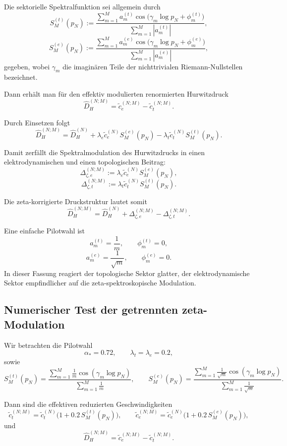 \documentclass[12pt,a4paper]{article}
\theoremstyle{definition}
\begin{document}
	Die sektorielle Spektralfunktion sei allgemein durch
	\[
	S_M^{(t)}(p_N)
	:=
	\frac{\displaystyle\sum_{m=1}^{M} a_m^{(t)}
		\cos\!\bigl(\gamma_m\log p_N+\phi_m^{(t)}\bigr)}
	{\displaystyle\sum_{m=1}^{M}|a_m^{(t)}|},
	\]
	\[
	S_M^{(e)}(p_N)
	:=
	\frac{\displaystyle\sum_{m=1}^{M} a_m^{(e)}
		\cos\!\bigl(\gamma_m\log p_N+\phi_m^{(e)}\bigr)}
	{\displaystyle\sum_{m=1}^{M}|a_m^{(e)}|},
	\]
	gegeben, wobei \(\gamma_m\) die imaginären Teile der nichttrivialen Riemann-Nullstellen bezeichnet.
	
	Dann erhält man für den effektiv modulierten renormierten Hurwitzdruck
	\[
	\widehat D_H^{(N;M)}
	=
	\tilde c_e^{(N;M)}-\tilde c_t^{(N;M)}.
	\]
	
	Durch Einsetzen folgt
	\[
	\widehat D_H^{(N;M)}
	=
	\widehat D_H^{(N)}
	+
	\lambda_e \tilde c_e^{(N)} S_M^{(e)}(p_N)
	-
	\lambda_t \tilde c_t^{(N)} S_M^{(t)}(p_N).
	\]
	
	Damit zerfällt die Spektralmodulation des Hurwitzdrucks in einen elektrodynamischen und einen topologischen Beitrag:
	\[
	\Delta_{\zeta,e}^{(N;M)}
	:=
	\lambda_e \tilde c_e^{(N)} S_M^{(e)}(p_N),
	\]
	\[
	\Delta_{\zeta,t}^{(N;M)}
	:=
	\lambda_t \tilde c_t^{(N)} S_M^{(t)}(p_N).
	\]
	
	Die zeta-korrigierte Druckstruktur lautet somit
	\[
	\widehat D_H^{(N;M)}
	=
	\widehat D_H^{(N)}+\Delta_{\zeta,e}^{(N;M)}-\Delta_{\zeta,t}^{(N;M)}.
	\]
	
	Eine einfache Pilotwahl ist
	\[
	a_m^{(t)}=\frac1m,\qquad \phi_m^{(t)}=0,
	\]
	\[
	a_m^{(e)}=\frac1{\sqrt m},\qquad \phi_m^{(e)}=0.
	\]
	In dieser Fassung reagiert der topologische Sektor glatter, der elektrodynamische Sektor empfindlicher auf die zeta-spektroskopische Modulation.
	
	\subsection{Numerischer Test der getrennten zeta-Modulation}
	
	Wir betrachten die Pilotwahl
	\[
	\alpha_\ast=0.72,\qquad \lambda_t=\lambda_e=0.2,
	\]
	sowie
	\[
	S_M^{(t)}(p_N)
	=
	\frac{\sum_{m=1}^{M}\frac1m\cos(\gamma_m\log p_N)}
	{\sum_{m=1}^{M}\frac1m},
	\qquad
	S_M^{(e)}(p_N)
	=
	\frac{\sum_{m=1}^{M}\frac1{\sqrt m}\cos(\gamma_m\log p_N)}
	{\sum_{m=1}^{M}\frac1{\sqrt m}}.
	\]
	
	Dann sind die effektiven reduzierten Geschwindigkeiten
	\[
	\tilde c_t^{(N;M)}=\tilde c_t^{(N)}\bigl(1+0.2\,S_M^{(t)}(p_N)\bigr),
	\qquad
	\tilde c_e^{(N;M)}=\tilde c_e^{(N)}\bigl(1+0.2\,S_M^{(e)}(p_N)\bigr),
	\]
	und
	\[
	\widehat D_H^{(N;M)}=\tilde c_e^{(N;M)}-\tilde c_t^{(N;M)}.
	\]
	
\end{document}
